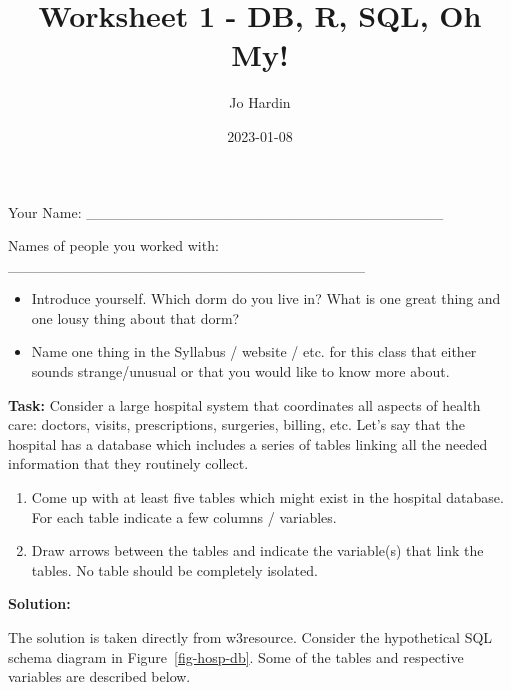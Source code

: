 \documentclass[
  letterpaper,
  DIV=11,
  numbers=noendperiod]{scrartcl}
\title{Worksheet 1 - DB, R, SQL, Oh My!}
\author{Jo Hardin}
\date{2023-01-08}
\begin{document}
\maketitle
\ifdefined\Shaded\renewenvironment{Shaded}{\begin{tcolorbox}[interior hidden, breakable, frame hidden, boxrule=0pt, enhanced, sharp corners, borderline west={3pt}{0pt}{shadecolor}]}{\end{tcolorbox}}\fi

Your Name:
\_\_\_\_\_\_\_\_\_\_\_\_\_\_\_\_\_\_\_\_\_\_\_\_\_\_\_\_\_\_\_\_\_\_

Names of people you worked with:
\_\_\_\_\_\_\_\_\_\_\_\_\_\_\_\_\_\_\_\_\_\_\_\_\_\_\_\_\_\_\_\_\_\_

\begin{itemize}
\item
  Introduce yourself. Which dorm do you live in? What is one great thing
  and one lousy thing about that dorm?
\item
  Name one thing in the Syllabus / website / etc. for this class that
  either sounds strange/unusual or that you would like to know more
  about.
\end{itemize}

\textbf{Task:} Consider a large hospital system that coordinates all
aspects of health care: doctors, visits, prescriptions, surgeries,
billing, etc. Let's say that the hospital has a database which includes
a series of tables linking all the needed information that they
routinely collect.

\begin{enumerate}
\def\labelenumi{\arabic{enumi}.}
\item
  Come up with at least five tables which might exist in the hospital
  database. For each table indicate a few columns / variables.
\item
  Draw arrows between the tables and indicate the variable(s) that link
  the tables. No table should be completely isolated.
\end{enumerate}

\newpage

\textbf{Solution:}

The solution is taken directly from w3resource. Consider the
hypothetical SQL schema diagram in Figure~\ref{fig-hosp-db}. Some of the
tables and respective variables are described below.
\end{document}
